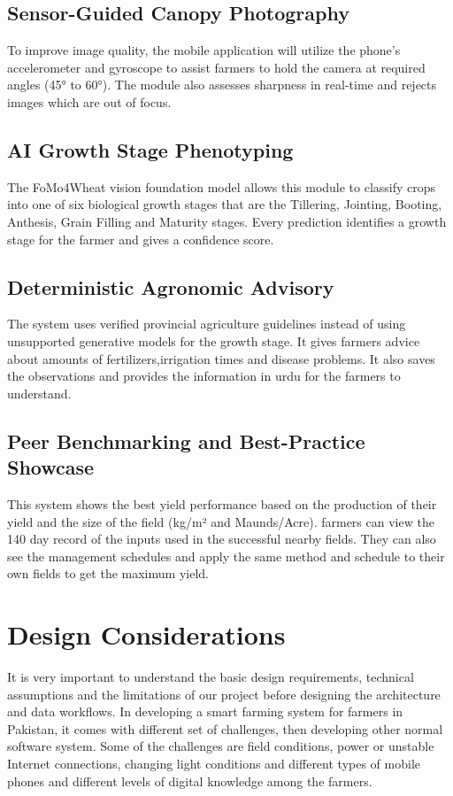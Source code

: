 \documentclass{FastFyp}
\begin{document}
\subsection{Sensor-Guided Canopy Photography}

To improve image quality, the mobile application will utilize the phone’s accelerometer and gyroscope to assist farmers to hold the camera at required angles (45° to 60°). The module also assesses sharpness in real-time and rejects images which are out of focus. 

\subsection{AI Growth Stage Phenotyping}

The FoMo4Wheat vision foundation model allows this module to classify crops into one of six biological growth stages that are the Tillering, Jointing, Booting, Anthesis, Grain Filling and Maturity stages. Every prediction identifies a growth stage for the farmer and gives a confidence score.  

\subsection{Deterministic Agronomic Advisory}

The system uses verified provincial agriculture guidelines instead of using unsupported generative models for the growth stage. It gives farmers advice about amounts of fertilizers,irrigation times and disease problems. It also saves the observations and provides the information in urdu for the farmers to understand.

\subsection{Peer Benchmarking and Best-Practice Showcase}

This system shows the best yield performance based on the production of their yield and the size of the field (kg/m² and Maunds/Acre). farmers can view the 140 day record of the inputs used in the successful nearby fields. They can also see the management schedules and apply the same method and schedule to their own fields to get the maximum yield.

 
\section{Design Considerations}
It is very important to understand the basic design requirements, technical assumptions and the limitations of our project before designing the architecture and data workflows. In developing a smart farming system for farmers in Pakistan, it comes with different set of challenges, then developing other normal software system. Some of the challenges are field conditions, power or unstable Internet connections, changing light conditions and different types of mobile phones and different levels of digital knowledge among the farmers.
\end{document}
